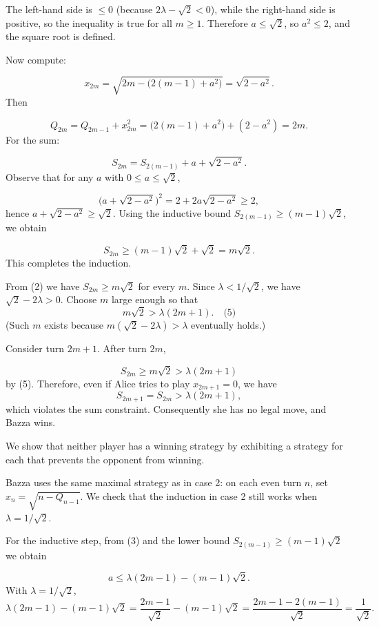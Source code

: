 The left-hand side is \(\le 0\) (because \(2\lambda - \sqrt{2} < 0\)), while the right-hand side is positive, so the inequality is true for all \(m\ge 1\). Therefore \(a \le \sqrt{2}\), so \(a^2 \le 2\), and the square root is defined.\par
Now compute:\par
\[
x_{2m} = \sqrt{2m - \bigl(2(m-1) + a^2\bigr)} = \sqrt{2 - a^2}.
\]
Then\par
\[
Q_{2m} = Q_{2m-1} + x_{2m}^2 = \bigl(2(m-1) + a^2\bigr) + (2 - a^2) = 2m.
\]
For the sum:\par
\[
S_{2m} = S_{2(m-1)} + a + \sqrt{2 - a^2}.
\]
Observe that for any \(a\) with \(0\le a\le \sqrt{2}\),\par
\[
\bigl(a + \sqrt{2 - a^2}\bigr)^2 = 2 + 2a\sqrt{2 - a^2} \ge 2,
\]
hence \(a + \sqrt{2 - a^2} \ge \sqrt{2}\). Using the inductive bound \(S_{2(m-1)} \ge (m-1)\sqrt{2}\), we obtain\par
\[
S_{2m} \ge (m-1)\sqrt{2} + \sqrt{2} = m\sqrt{2}.
\]
This completes the induction.\par
{}
From (2) we have \(S_{2m} \ge m\sqrt{2}\) for every \(m\). Since \(\lambda < 1/\sqrt{2}\), we have \(\sqrt{2} - 2\lambda > 0\). Choose \(m\) large enough so that
\[
m\sqrt{2} > \lambda(2m+1). \quad\text{(5)}
\]
(Such \(m\) exists because \(m(\sqrt{2} - 2\lambda) > \lambda\) eventually holds.)\par
Consider turn \(2m+1\). After turn \(2m\),\par
\[
S_{2m} \ge m\sqrt{2} > \lambda(2m+1)
\]
by (5). Therefore, even if Alice tries to play \(x_{2m+1}=0\), we have
\[
S_{2m+1} = S_{2m} > \lambda(2m+1),
\]
which violates the sum constraint. Consequently she has no legal move, and Bazza wins.\par
\smallskip
{}
We show that neither player has a winning strategy by exhibiting a strategy for each that prevents the opponent from winning.\par
{}
Bazza uses the same maximal strategy as in case 2: on each even turn \(n\), set \(x_n = \sqrt{n - Q_{n-1}}\). We check that the induction in case 2 still works when \(\lambda = 1/\sqrt{2}\).\par
For the inductive step, from (3) and the lower bound \(S_{2(m-1)} \ge (m-1)\sqrt{2}\) we obtain\par
\[
a \le \lambda(2m-1) - (m-1)\sqrt{2}.
\]
With \(\lambda = 1/\sqrt{2}\),
\[
\lambda(2m-1) - (m-1)\sqrt{2} = \frac{2m-1}{\sqrt{2}} - (m-1)\sqrt{2} = \frac{2m-1 - 2(m-1)}{\sqrt{2}} = \frac{1}{\sqrt{2}}.
\]
